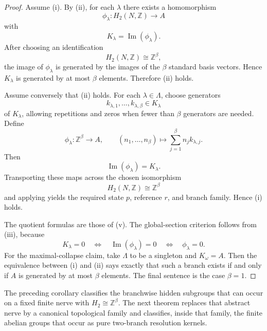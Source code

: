 \begin{proof}
Assume \textup{(i)}. By (ii), for each $\lambda$ there exists a homomorphism
\[
\phi_\lambda:H_2(N,\mathbb Z)\to A
\]
with
\[
K_\lambda=\operatorname{Im}(\phi_\lambda).
\]
After choosing an identification
\[
H_2(N,\mathbb Z)\cong \mathbb Z^\beta,
\]
the image of $\phi_\lambda$ is generated by the images of the $\beta$ standard basis vectors. Hence $K_\lambda$ is generated by at most $\beta$ elements. Therefore \textup{(ii)} holds.

Assume conversely that \textup{(ii)} holds. For each $\lambda\in\Lambda$, choose generators
\[
k_{\lambda,1},\dots,k_{\lambda,\beta}\in K_\lambda
\]
of $K_\lambda$, allowing repetitions and zeros when fewer than $\beta$ generators are needed. Define
\[
\phi_\lambda:\mathbb Z^\beta\to A,
\qquad
(n_1,\dots,n_\beta)\longmapsto \sum_{j=1}^{\beta} n_j k_{\lambda,j}.
\]
Then
\[
\operatorname{Im}(\phi_\lambda)=K_\lambda.
\]
Transporting these maps across the chosen isomorphism
\[
H_2(N,\mathbb Z)\cong \mathbb Z^\beta
\]
and applying  yields the required state $p$, reference $r$, and branch family. Hence \textup{(i)} holds.

The quotient formulas are those of (v). The global-section criterion follows from (iii), because
\[
K_\lambda=0
\quad\Longleftrightarrow\quad
\operatorname{Im}(\phi_\lambda)=0
\quad\Longleftrightarrow\quad
\phi_\lambda=0.
\]
For the maximal-collapse claim, take $\Lambda$ to be a singleton and $K_\omega=A$. Then the equivalence between \textup{(i)} and \textup{(ii)} says exactly that such a branch exists if and only if $A$ is generated by at most $\beta$ elements. The final sentence is the case $\beta=1$.
\end{proof}

The preceding corollary classifies the branchwise hidden subgroups that can occur on a fixed finite nerve with $H_2\cong \mathbb Z^\beta$. The next theorem replaces that abstract nerve by a canonical topological family and classifies, inside that family, the finite abelian groups that occur as pure two-branch resolution kernels.

